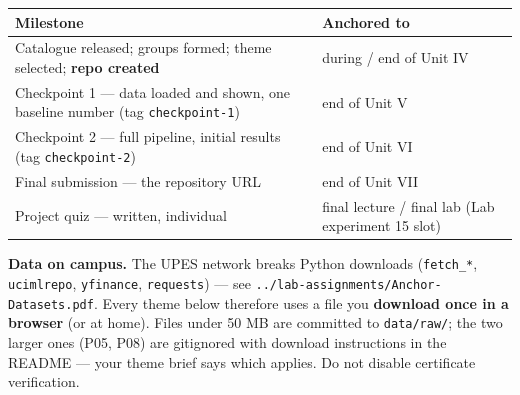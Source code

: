 \documentclass[11pt]{article}
\begin{document}
{\footnotesize
\begin{longtable}[]{@{}ll@{}}
\toprule
\begin{minipage}[b]{0.47\columnwidth}\raggedright
Milestone\strut
\end{minipage} & \begin{minipage}[b]{0.47\columnwidth}\raggedright
Anchored to\strut
\end{minipage}\tabularnewline
\midrule
\endhead
\begin{minipage}[t]{0.47\columnwidth}\raggedright
Catalogue released; groups formed; theme selected; \textbf{repo created}\strut
\end{minipage} & \begin{minipage}[t]{0.47\columnwidth}\raggedright
during / end of Unit IV\strut
\end{minipage}\tabularnewline
\begin{minipage}[t]{0.47\columnwidth}\raggedright
Checkpoint 1 --- data loaded and shown, one baseline number (tag \texttt{checkpoint-1})\strut
\end{minipage} & \begin{minipage}[t]{0.47\columnwidth}\raggedright
end of Unit V\strut
\end{minipage}\tabularnewline
\begin{minipage}[t]{0.47\columnwidth}\raggedright
Checkpoint 2 --- full pipeline, initial results (tag \texttt{checkpoint-2})\strut
\end{minipage} & \begin{minipage}[t]{0.47\columnwidth}\raggedright
end of Unit VI\strut
\end{minipage}\tabularnewline
\begin{minipage}[t]{0.47\columnwidth}\raggedright
Final submission --- the repository URL\strut
\end{minipage} & \begin{minipage}[t]{0.47\columnwidth}\raggedright
end of Unit VII\strut
\end{minipage}\tabularnewline
\begin{minipage}[t]{0.47\columnwidth}\raggedright
Project quiz --- written, individual\strut
\end{minipage} & \begin{minipage}[t]{0.47\columnwidth}\raggedright
final lecture / final lab (Lab experiment 15 slot)\strut
\end{minipage}\tabularnewline
\bottomrule
\end{longtable}
}

\textbf{Data on campus.} The UPES network breaks Python downloads (\texttt{fetch\_*}, \texttt{ucimlrepo}, \texttt{yfinance}, \texttt{requests}) --- see \texttt{../lab-assignments/Anchor-Datasets.pdf}. Every theme below therefore uses a file you \textbf{download once in a browser} (or at home). Files under 50 MB are committed to \texttt{data/raw/}; the two larger ones (P05, P08) are gitignored with download instructions in the README --- your theme brief says which applies. Do not disable certificate verification.
\end{document}
